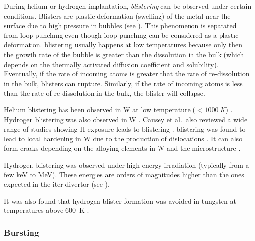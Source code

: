 During helium or hydrogen implantation, \emph{\gls{blistering}} can be observed under certain conditions.
Blisters are plastic deformation (swelling) of the metal near the surface due to high pressure in bubbles (see ).
This phenomenon is separated from \gls{loop punching} even though \gls{loop punching} can be considered as a plastic deformation.
\Gls{blistering} usually happens at low temperatures because only then the growth rate of the bubble is greater than the dissolution in the bulk (which depends on the thermally activated diffusion coefficient and solubility).
Eventually, if the rate of incoming atoms is greater that the rate of re-dissolution in the bulk, blisters can rupture.
Similarly, if the rate of incoming atoms is less than the rate of re-dissolution in the bulk, the blister will collapse.

Helium \gls{blistering} has been observed in \gls{W} at low temperature ($< \SI{1000}{K}$) .
Hydrogen \gls{blistering} was also observed in \gls{W} .
Causey et al.\ also reviewed a wide range of studies showing H exposure leads to \gls{blistering} .
\Gls{blistering} was found to lead to local hardening in \gls{W} due to the production of dislocations .
It can also form cracks depending on the alloying elements in \gls{W} and the microstructure .

Hydrogen \gls{blistering} was observed under high energy irradiation (typically from a few \si{keV} to \si{MeV}).
These energies are orders of magnitudes higher than the ones expected in the \acrshort{iter} \gls{divertor} (see ).

It was also found that hydrogen blister formation was avoided in tungsten at temperatures above \SI{600}{K} .

\subsubsection{Bursting}

